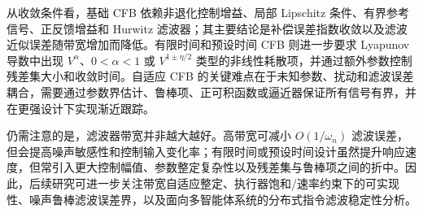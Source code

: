 \documentclass[UTF8,a4paper,11pt,fontset=fandol]{ctexart}
\begin{document}
从收敛条件看，基础 CFB 依赖非退化控制增益、局部 Lipschitz 条件、有界参考信号、正反馈增益和 Hurwitz 滤波器；其主要结论是补偿误差指数收敛以及滤波近似误差随带宽增加而降低。有限时间和预设时间 CFB 则进一步要求 Lyapunov 导数中出现 $V^\alpha$、$0<\alpha<1$ 或 $V^{1\pm\eta/2}$ 类型的非线性耗散项，并通过额外参数控制残差集大小和收敛时间。自适应 CFB 的关键难点在于未知参数、扰动和滤波误差耦合，需要通过参数界估计、鲁棒项、正可积函数或逼近器保证所有信号有界，并在更强设计下实现渐近跟踪。

仍需注意的是，滤波器带宽并非越大越好。高带宽可减小 $O(1/\omega_n)$ 滤波误差，但会提高噪声敏感性和控制输入变化率；有限时间或预设时间设计虽然提升响应速度，但常引入更大控制幅值、参数整定复杂性以及残差集与鲁棒项之间的折中。因此，后续研究可进一步关注带宽自适应整定、执行器饱和/速率约束下的可实现性、噪声鲁棒滤波误差界，以及面向多智能体系统的分布式指令滤波稳定性分析。
\end{document}
